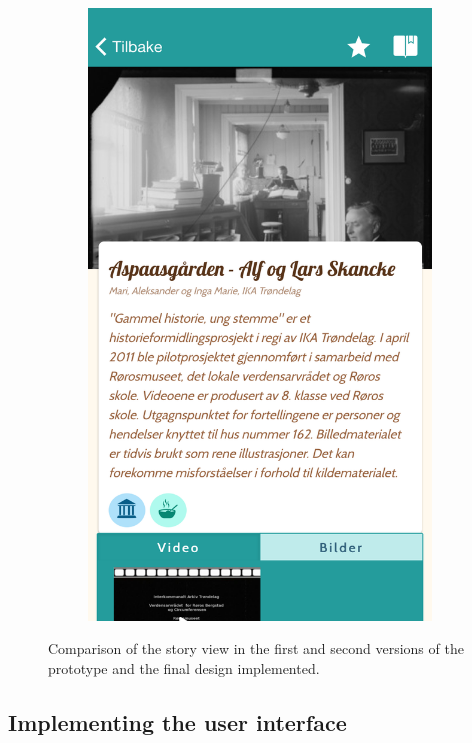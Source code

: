 \begin{figure}
\begin{subfigure}[h]{0.3\textwidth}
		\includegraphics[width=\textwidth]{fig/screenshot_story}
	\end{subfigure}
	\caption{Comparison of the story view in the first and second versions of the prototype and the final design implemented.}
	\label{Fig:prototype}
\end{figure}


\subsection{Implementing the user interface}
\label{subsec:user_interface}

